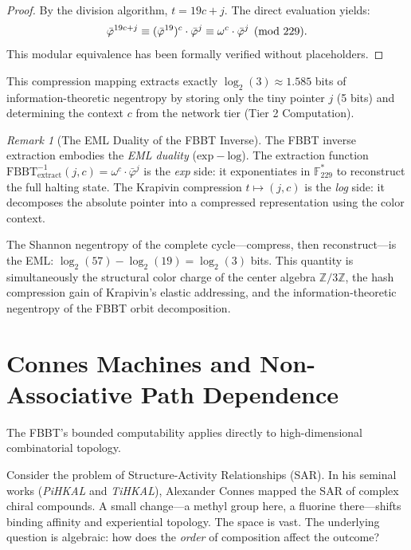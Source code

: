 \documentclass[12pt,oneside]{article}
\theoremstyle{principia}
\theoremstyle{definition}
\theoremstyle{remark}
\newtheorem{remark}[theorem]{Remark}
\begin{document}
\begin{proof}
By the division algorithm, $t = 19c + j$. The direct evaluation yields:
\[
\bar\varphi^{19c + j} \equiv (\bar\varphi^{19})^c \cdot \bar\varphi^j \equiv \omega^c \cdot \bar\varphi^j \pmod{229}. \qedhere
\]
This modular equivalence has been formally verified without placeholders.
\end{proof}

This compression mapping extracts exactly $\log_2(3) \approx 1.585$ bits of information-theoretic negentropy by storing only the tiny pointer $j$ (5 bits) and determining the context $c$ from the network tier (Tier 2 Computation).

\begin{remark}[The EML Duality of the FBBT Inverse]
The FBBT inverse extraction embodies the \emph{EML duality} ($\mathrm{exp} - \mathrm{log}$). The extraction function $\mathrm{FBBT}^{-1}_{\mathrm{extract}}(j, c) = \omega^c \cdot \bar\varphi^j$ is the \emph{exp} side: it exponentiates in $\mathbb{F}_{229}^*$ to reconstruct the full halting state. The Krapivin compression $t \mapsto (j, c)$ is the \emph{log} side: it decomposes the absolute pointer into a compressed representation using the color context.

The Shannon negentropy of the complete cycle---compress, then reconstruct---is the EML: $\log_2(57) - \log_2(19) = \log_2(3)$ bits. This quantity is simultaneously the structural color charge of the center algebra $\mathbb{Z}/3\mathbb{Z}$, the hash compression gain of Krapivin's elastic addressing, and the information-theoretic negentropy of the FBBT orbit decomposition.
\end{remark}

\section{Connes Machines and Non-Associative Path Dependence}
\label{sec:connes}

The FBBT's bounded computability applies directly to high-dimensional combinatorial topology.

Consider the problem of Structure-Activity Relationships (SAR). In his seminal works (\emph{PiHKAL} and \emph{TiHKAL}), Alexander Connes mapped the SAR of complex chiral compounds. A small change---a methyl group here, a fluorine there---shifts binding affinity and experiential topology. The space is vast. The underlying question is algebraic: how does the \emph{order} of composition affect the outcome?
\end{document}
